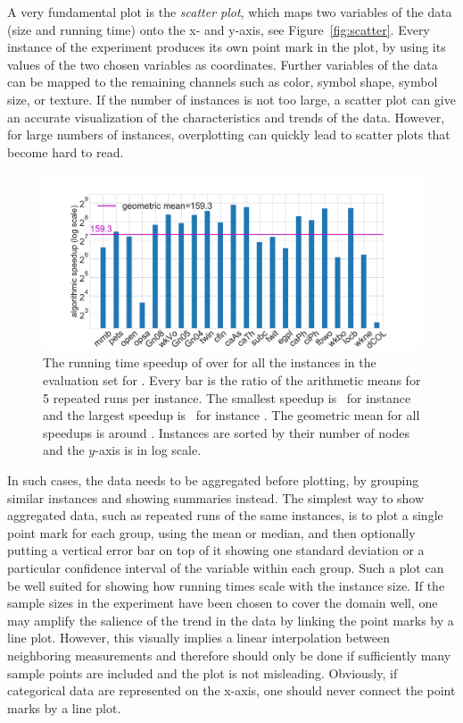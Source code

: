 \documentclass[algorithms,article,submit,moreauthors,pdftex]{Definitions/mdpi}
\newcommand{\changed}[1]{#1}
\begin{document}
A very fundamental plot is the \emph{scatter plot}, which maps two variables of the data (\eg size and running time)  onto the x- and y-axis, see Figure~\ref{fig:scatter}.
Every instance of the experiment produces its own point mark in the plot, by using its values of the two chosen variables as coordinates.
Further variables of the data can be mapped to the remaining channels such as color, symbol shape, symbol size, or texture.
If the number of instances is not too large, a scatter plot can give an accurate visualization of the characteristics and trends of the data.
However, for large numbers of instances, overplotting can quickly lead to scatter plots that become hard to read.

\begin{figure}
\includegraphics[width=\textwidth]{speedupPlot.pdf}
\caption{ The running time speedup of \kad over \rk for all the instances in the evaluation set
for \changed{\tunParamValue}. 
Every bar is the ratio of the arithmetic means for 5 repeated runs per instance.
\changed{The smallest speedup is \speedUpMin\ for instance \maxSpeedUpInst~ 
and the largest speedup is \speedUpMax\ for instance \minSpeedUpInst.
The geometric mean for all speedups is around \speedUpGeomMean.}
Instances are sorted by their number of nodes and the $y$-axis is in log scale.
}
\label{fig:speedup}
\end{figure}

In such cases, the data needs to be aggregated before plotting, by grouping similar instances and showing summaries instead.
The simplest way to show aggregated data, such as repeated runs of the same instances, is to plot a single point mark for each group, \eg using the mean or median, and then optionally putting a vertical error bar on top of it showing one standard deviation or a particular confidence interval of the variable within each group.
Such a plot can be well suited for showing how running times scale with the instance size.
If the sample sizes in the experiment have been chosen to cover the domain well, one may amplify the salience of the trend in the data by linking the point marks by a line plot.
However, this visually implies a linear interpolation between neighboring measurements and therefore should only be done if sufficiently many sample points are included and the plot is not misleading.
Obviously, if categorical data are represented on the x-axis, one should never connect the point marks by a line plot.
\end{document}
